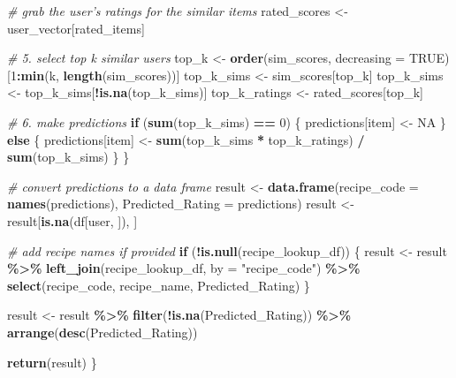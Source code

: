 \documentclass[
]{article}
\newenvironment{Shaded}{\begin{snugshade}}{\end{snugshade}}
\newcommand{\AttributeTok}[1]{\textcolor[rgb]{0.13,0.29,0.53}{#1}}
\newcommand{\CommentTok}[1]{\textcolor[rgb]{0.56,0.35,0.01}{\textit{#1}}}
\newcommand{\ConstantTok}[1]{\textcolor[rgb]{0.56,0.35,0.01}{#1}}
\newcommand{\ControlFlowTok}[1]{\textcolor[rgb]{0.13,0.29,0.53}{\textbf{#1}}}
\newcommand{\DecValTok}[1]{\textcolor[rgb]{0.00,0.00,0.81}{#1}}
\newcommand{\FunctionTok}[1]{\textcolor[rgb]{0.13,0.29,0.53}{\textbf{#1}}}
\newcommand{\NormalTok}[1]{#1}
\newcommand{\OtherTok}[1]{\textcolor[rgb]{0.56,0.35,0.01}{#1}}
\newcommand{\SpecialCharTok}[1]{\textcolor[rgb]{0.81,0.36,0.00}{\textbf{#1}}}
\newcommand{\StringTok}[1]{\textcolor[rgb]{0.31,0.60,0.02}{#1}}
\begin{document}
\begin{Shaded}
\begin{Highlighting}[]
    \CommentTok{\# grab the user’s ratings for the similar items}
\NormalTok{    rated\_scores }\OtherTok{\textless{}{-}}\NormalTok{ user\_vector[rated\_items]}

    \CommentTok{\# 5. select top k similar users}
\NormalTok{    top\_k }\OtherTok{\textless{}{-}} \FunctionTok{order}\NormalTok{(sim\_scores, }\AttributeTok{decreasing =} \ConstantTok{TRUE}\NormalTok{)[}\DecValTok{1}\SpecialCharTok{:}\FunctionTok{min}\NormalTok{(k, }\FunctionTok{length}\NormalTok{(sim\_scores))]}
\NormalTok{    top\_k\_sims }\OtherTok{\textless{}{-}}\NormalTok{ sim\_scores[top\_k]}
\NormalTok{    top\_k\_sims }\OtherTok{\textless{}{-}}\NormalTok{ top\_k\_sims[}\SpecialCharTok{!}\FunctionTok{is.na}\NormalTok{(top\_k\_sims)]}
\NormalTok{    top\_k\_ratings }\OtherTok{\textless{}{-}}\NormalTok{ rated\_scores[top\_k]}

    \CommentTok{\# 6. make predictions}
    \ControlFlowTok{if}\NormalTok{ (}\FunctionTok{sum}\NormalTok{(top\_k\_sims) }\SpecialCharTok{==} \DecValTok{0}\NormalTok{) \{}
\NormalTok{      predictions[item] }\OtherTok{\textless{}{-}} \ConstantTok{NA}
\NormalTok{    \} }\ControlFlowTok{else}\NormalTok{ \{}
\NormalTok{      predictions[item] }\OtherTok{\textless{}{-}} \FunctionTok{sum}\NormalTok{(top\_k\_sims }\SpecialCharTok{*}\NormalTok{ top\_k\_ratings) }\SpecialCharTok{/} \FunctionTok{sum}\NormalTok{(top\_k\_sims)}
\NormalTok{    \}}
\NormalTok{  \}}

  \CommentTok{\# convert predictions to a data frame}
\NormalTok{  result }\OtherTok{\textless{}{-}} \FunctionTok{data.frame}\NormalTok{(}\AttributeTok{recipe\_code =} \FunctionTok{names}\NormalTok{(predictions), }\AttributeTok{Predicted\_Rating =}\NormalTok{ predictions)}
\NormalTok{  result }\OtherTok{\textless{}{-}}\NormalTok{ result[}\FunctionTok{is.na}\NormalTok{(df[user, ]), ]}

  \CommentTok{\# add recipe names if provided}
  \ControlFlowTok{if}\NormalTok{ (}\SpecialCharTok{!}\FunctionTok{is.null}\NormalTok{(recipe\_lookup\_df)) \{}
\NormalTok{    result }\OtherTok{\textless{}{-}}\NormalTok{ result }\SpecialCharTok{\%\textgreater{}\%}
      \FunctionTok{left\_join}\NormalTok{(recipe\_lookup\_df, }\AttributeTok{by =} \StringTok{"recipe\_code"}\NormalTok{) }\SpecialCharTok{\%\textgreater{}\%}
      \FunctionTok{select}\NormalTok{(recipe\_code, recipe\_name, Predicted\_Rating)}
\NormalTok{  \}}

\NormalTok{  result }\OtherTok{\textless{}{-}}\NormalTok{ result }\SpecialCharTok{\%\textgreater{}\%}
    \FunctionTok{filter}\NormalTok{(}\SpecialCharTok{!}\FunctionTok{is.na}\NormalTok{(Predicted\_Rating)) }\SpecialCharTok{\%\textgreater{}\%}
    \FunctionTok{arrange}\NormalTok{(}\FunctionTok{desc}\NormalTok{(Predicted\_Rating))}

  \FunctionTok{return}\NormalTok{(result)}
\NormalTok{\}}
\end{Highlighting}
\end{Shaded}
\end{document}
